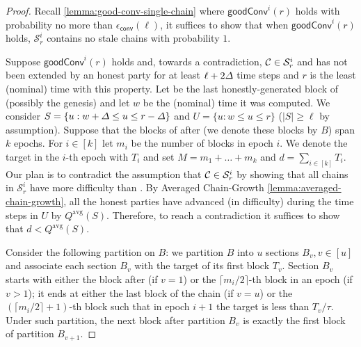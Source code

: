 \begin{proof}
    Recall \cref{lemma:good-conv-single-chain} where $\mathsf{goodConv}^i(r)$ holds with probability no more than $\epsilon_{\mathsf{conv}}(\ell)$, it suffices to show that when $\mathsf{goodConv}^i(r)$ holds, $\mathcal{S}^i_r$ contains no stale chains with probability $1$.

    Suppose $\mathsf{goodConv}^i(r)$ holds and, towards a contradiction, $\mathcal{C} \in \mathcal{S}^i_r$ and has not been extended by an honest party for at least $\ell + 2\varDelta$ time steps and $r$ is the least (nominal) time with this property.
    Let \block be the last honestly-generated block of \chain (possibly the genesis) and let $w$ be the (nominal) time it was computed.
    We consider $S = \{ u : w + \varDelta \le u \le r - \varDelta \}$ and $U = \{u : w \le u \le r\}$ ($|S| \ge \ell$ by assumption).
    Suppose that the blocks of \chain after \block (we denote these blocks by $B$) span $k$ epochs.
    For $i \in [k]$ let $m_i$ be the number of blocks in epoch $i$.
    We denote the target in the $i$-th epoch with $T_i$ and set $M = m_1 + \ldots + m_k$  and $d = \sum_{i \in [k]} T_i$.
    Our plan is to contradict the assumption that $\mathcal{C} \in \mathcal{S}^i_r$ by showing that all chains in $\mathcal{S}^i_r$ have more difficulty than \chain.
    By Averaged Chain-Growth \cref{lemma:averaged-chain-growth}, all the honest parties have advanced (in difficulty) during the time steps in $U$ by $Q^{\mathrm{avg}}(S)$.
    Therefore, to reach a contradiction it suffices to show that $d < Q^{\mathrm{avg}}(S)$.

    Consider the following partition on $B$: we partition $B$ into $u$ sections $B_v, v \in [u]$ and associate each section $B_v$ with the target of its first block $T_v$.
    Section $B_v$ starts with either the block after \block (if $v = 1$) or the $\lceil m_i / 2 \rceil$-th block in an epoch (if $v > 1$); it ends at either the last block of the chain (if $v = u$) or the $(\lceil m_i / 2 \rceil + 1)$-th block such that in epoch $i + 1$ the target is less than $T_v / \tau$.
    Under such partition, the next block after partition $B_v$ is exactly the first block of partition $B_{v + 1}$.


\end{proof}
